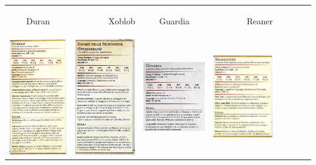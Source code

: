 \documentclass{article}
\begin{document}
\begin{table}
    \centering
    \begin{tabular}{|cr|cr|cr|cr|}
        \hline
        \hypertarget{Duran}{Duran} & \hypertarget{Xoblob}{Xoblob} & \hypertarget{guardia}{Guardia} & \hypertarget{Reaner}{Reaner} \\
        \includegraphics[width=4cm, height = 6 cm]{../PNG/Duran.png} &  \includegraphics[width=4cm, height = 6 cm]{../Mostri/Gnomo_delle_profondita.png} &\includegraphics[width=4cm, height = 6 cm]{../Mostri/Guardia.png} & \includegraphics[width=4cm, height = 6 cm]{../PNG/Reaner_Nevember_Spadaccino.png}\\
        
        
    \end{tabular}
\end{table}
\end{document}
